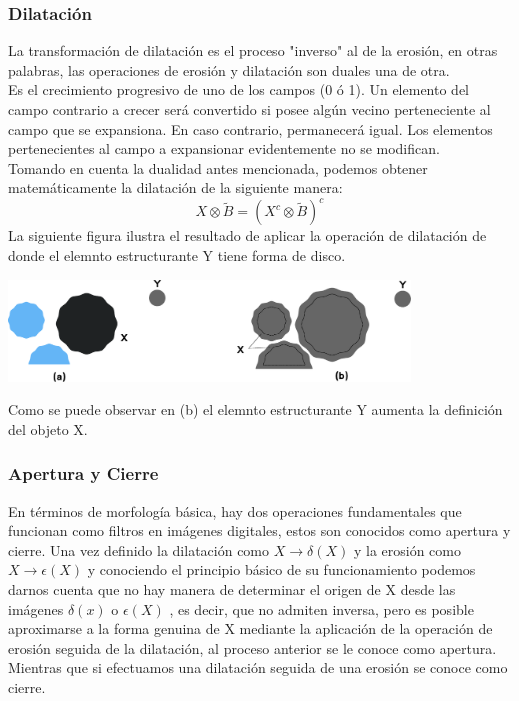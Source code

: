 \subsubsection{Dilatación}
La transformación de dilatación es el proceso "inverso" al de la erosión, en otras palabras, las operaciones de erosión y dilatación son duales una de otra.\\
Es el crecimiento progresivo de uno de los campos (0 ó 1). Un elemento del
campo contrario a crecer será convertido si posee algún vecino perteneciente al campo
que se expansiona. En caso contrario, permanecerá igual. Los elementos pertenecientes
al campo a expansionar evidentemente no se modifican.\cite{Book:Jose2005}\\
Tomando en cuenta la dualidad antes mencionada, podemos obtener matemáticamente la dilatación de la siguiente manera:
\begin{equation}
	X \otimes \tilde{B} = (X^c \otimes \tilde{B})^c
\end{equation}
La siguiente figura ilustra el resultado de aplicar la operación de dilatación de donde el elemnto estructurante Y tiene forma de disco.
\begin{center}
	\includegraphics[width=0.8\textwidth]{Contenido/Cuerpo/Capitulo2/Fig15.eps}
	\label{fig:MarcoTeorico:Fig23}
\end{center}
Como se puede observar en (b) el elemnto estructurante Y aumenta la definición del objeto X.

\subsubsection{Apertura y Cierre}
En términos de morfología básica, hay dos operaciones fundamentales que funcionan como filtros en imágenes digitales, estos son conocidos como apertura
y cierre. Una vez definido la dilatación como $X \rightarrow \delta(X)$ y la erosión como $X \rightarrow \epsilon(X)$ y conociendo el principio
básico de su funcionamiento podemos darnos cuenta que no hay manera de determinar el origen de X desde las imágenes $\delta(x)$ o $\epsilon(X)$
, es decir, que no admiten inversa, pero es posible aproximarse a la forma genuina de X mediante la aplicación de la operación de erosión
seguida de la dilatación, al proceso anterior se le conoce como apertura. Mientras que si efectuamos una dilatación seguida de una erosión se conoce
como cierre.

